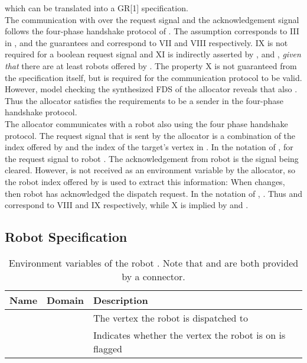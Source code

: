 which can be translated into a GR[1] specification.\\

The communication with  over the request signal  and the acknowledgement signal  follows the four-phase handshake protocol of . The assumption  corresponds to III in , and the guarantees  and  correspond to VII and VIII respectively. IX is not required for a boolean request signal and XI is indirectly asserted by ,  and , \emph{given that} there are at least  robots offered by . The property X is not guaranteed from the specification itself, but is required for the communication protocol to be valid. However, model checking the synthesized FDS of the allocator  reveals that also . Thus the allocator satisfies the requirements to be a sender in the four-phase handshake protocol.\\

The allocator communicates with a robot also using the four phase handshake protocol. The request signal that is sent by the allocator is a combination of the index  offered by  and the index of the target's vertex in . In the notation of ,  for the request signal to robot . The acknowledgement from robot  is the signal  being cleared. However,  is not received as an environment variable by the allocator, so the robot index  offered by  is used to extract this information: When  changes, then robot  has acknowledged the dispatch request. In the notation of , . Thus  and  correspond to VIII and IX respectively, while X is implied by  and .\\


\subsection{Robot Specification}

\begin{table}
\centering
\begin{tabular}{c|c|l}
\hline
Name & Domain & Description \\
\hline
 &  & The vertex the robot is dispatched to \\
 &  & Indicates whether the vertex the robot is on is flagged \\
\hline
\end{tabular}
\caption{Environment variables of the robot . Note that  and  are both provided by a connector.}
\label{tab:env:robot}
\end{table}

